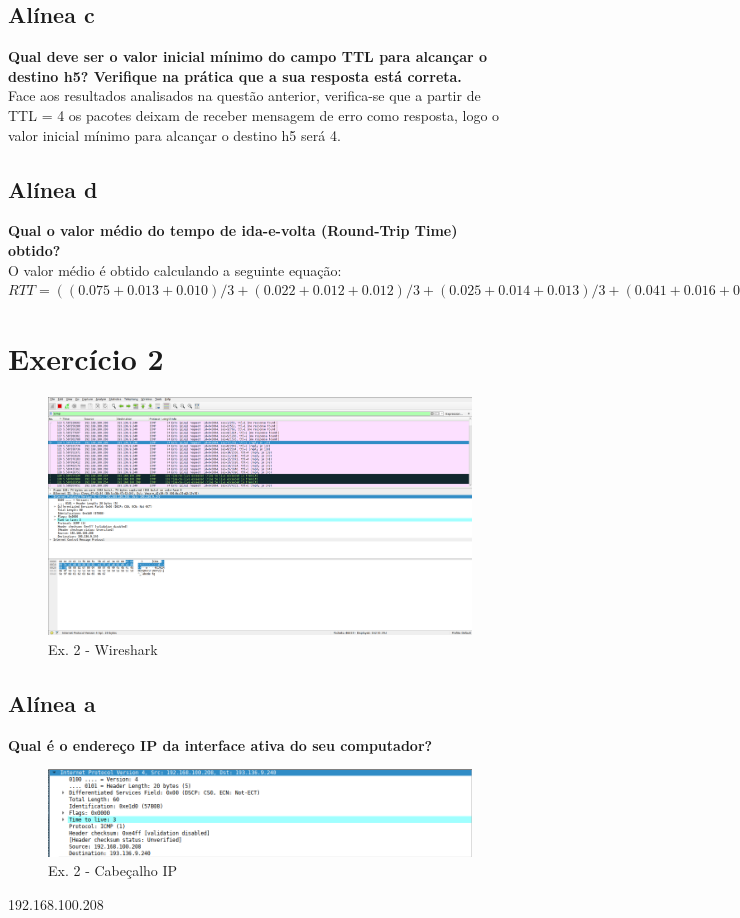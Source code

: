 \documentclass[a4paper]{report}
\begin{document}
\subsection{Alínea c}
\textbf{Qual deve ser o valor inicial mínimo do campo TTL para alcançar o
destino h5? Verifique na prática que a sua resposta está correta.}\\
Face aos resultados analisados na questão anterior, verifica-se que a partir de
TTL = 4 os pacotes deixam de receber mensagem de erro como resposta, logo o
valor inicial mínimo para alcançar o destino h5 será 4.

\subsection{Alínea d}
\textbf{Qual o valor médio do tempo de ida-e-volta (Round-Trip Time) obtido?}\\
O valor médio é obtido calculando a seguinte equação:
\begin{math}
RTT = ((0.075 + 0.013 + 0.010) / 3 + (0.022 + 0.012 + 0.012) / 3 + (0.025 +
0.014 + 0.013) / 3 + (0.041 + 0.016 + 0.015) / 3) * 2 = 0.178
\end{math}

\section{Exercício 2}

\begin{figure}[H]
    \centering 
    \includegraphics[width=\textwidth]{images/wiresharkEx2.png}  
    \caption{Ex. 2 - Wireshark}
    \label{fig:wiresharkEx2}
\end{figure}

\subsection{Alínea a}
\textbf{Qual é o endereço IP da interface ativa do seu computador?}
\begin{figure}[H]
    \centering 
    \includegraphics[width=\textwidth]{images/ipEx2.png}
    \caption{Ex. 2 - Cabeçalho IP}
    \label{fig:ipEx2}
\end{figure}
192.168.100.208
\end{document}
